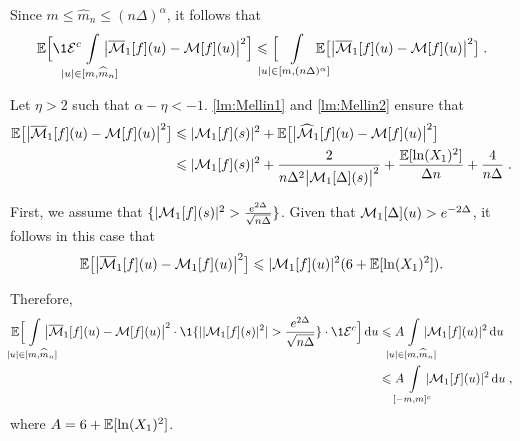Since $m \leq \hat{m}_n \leq (n\Delta)^\alpha$, it follows that
\begin{align*}
    \EE \Big[ \1{\Ecal^c} \hspace{-0.5cm} \int_{|u| \in [m, \hat m_n]} \limits \hspace{-0.5cm} \big|\bar \Mcal_1[f](u) - \Mcal[f](u)\big|^2 \Big]
    \leq
    \Big[ \hspace{-0.5cm} \int_{|u| \in [m, (n\Delta)^\alpha]}\limits \hspace{-0.5cm} \EE  \big[\big|\bar \Mcal_1[f](u) - \Mcal[f](u)\big|^2 \big]
    \eqfinp
\end{align*}

Let $\eta > 2$ such that $\alpha-\eta < -1$. \cref{lm:Mellin1} and \cref{lm:Mellin2} ensure that
\begin{align*}
    \mathbb{E}  \big[\big|\overline {\mathcal{M}}_1[f](u) - \mathcal{M}[f](u)\big|^2 \big]
    &\leqslant |\mathcal{M}_1[f](s)|^2 + \mathbb{E}  \big[\big|\widehat {\mathcal{M}}_1[f](u) - \mathcal{M}[f](u)\big|^2 \big]  \\
    &\leqslant  |\mathcal{M}_1[f](s)|^2 + \frac{2}{n \Delta^2 \big|\mathcal{M}_1[\Delta](s)\big|^2}
    + \frac{\mathbb{E}[\ln(X_1)^2]}{\Delta n} + \frac{4}{n \Delta}
    \; .
\end{align*}

First, we assume that $\{|\mathcal{M}_1[f](s)|^2 > \frac{e^{2\Delta}}{\sqrt{n\Delta}}\}$. Given that $\mathcal{M}_1[\Delta](u) > e^{-2\Delta}$, it follows in this case that 
\begin{align*}
    \mathbb{E}  \big[\big|\overline {\mathcal{M}}_1[f](u) - \mathcal{M}_1[f](u)\big|^2 \big]
    \leqslant |\mathcal{M}_1[f](u)|^2 (6 + \mathbb{E}[\ln(X_1)^2]). 
\end{align*}

Therefore, 
\begin{align*}
    \EE \Big[ \hspace{-0.5cm} \int_{|u| \in [m, \hat m_n]} \limits \hspace{-0.5cm} \big|\bar \Mcal_1[f](u) - \Mcal[f](u)\big|^2 \cdot \1{\{||\Mcal_1[f](s)|^2| > \frac{e^{2\Delta}}{\sqrt{n\Delta}}\}} \cdot \1{\Ecal^c} \Big] \diff u 
    &\leq A \hspace{-0.5cm} \int_{|u| \in [m, \hat m_n]} \limits \hspace{-0.5cm} |\Mcal_1[f](u)|^2 \diff u \\
    &\leq A \hspace{-0.3cm} \int_{[-m, m]^c} \limits \hspace{-0.3cm} |\Mcal_1[f](u)|^2 \diff u
    \eqfinv
\end{align*}
where $A = 6 + \mathbb{E}[\ln(X_1)^2]$.\\

